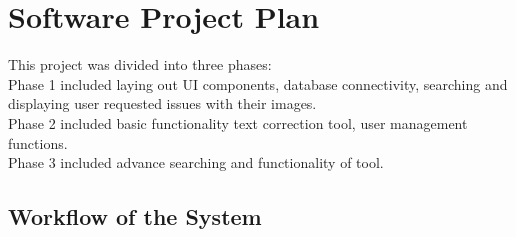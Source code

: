 \documentclass[amsart, 12pt]{article}
\begin{document}
\section{Software Project Plan}

This project was divided into three phases: \\
Phase 1 included laying out UI components, database connectivity, searching and displaying user requested issues with their images. \\
Phase 2 included basic functionality text correction tool, user management functions. \\
Phase 3 included advance searching and functionality of tool. \\

\subsection{Workflow of the System}
\end{document}
